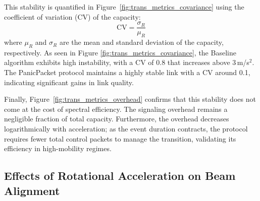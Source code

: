 \documentclass[fleqn,10pt]{wlscirep}
\begin{document}
This stability is quantified in Figure~\ref{fig:trans_metrics_covariance} using the coefficient of variation (CV) of the capacity:
\begin{equation}
    \text{CV} = \frac{\sigma_R}{\mu_R}
\end{equation}
where $\mu_R$ and $\sigma_R$ are the mean and standard deviation of the capacity, respectively. As seen in Figure \ref{fig:trans_metrics_covariance}, the Baseline algorithm exhibits high instability, with a CV of 0.8 that increases above 3\,m/s$^2$. The PanicPacket protocol maintains a highly stable link with a CV around 0.1, indicating significant gains in link quality. 

Finally, Figure~\ref{fig:trans_metrics_overhead} confirms that this stability does not come at the cost of spectral efficiency. The signaling overhead remains a negligible fraction of total capacity. Furthermore, the overhead decreases logarithmically with acceleration; as the event duration contracts, the protocol requires fewer total control packets to manage the transition, validating its efficiency in high-mobility regimes.

\subsection*{Effects of Rotational Acceleration on Beam Alignment}
\end{document}
